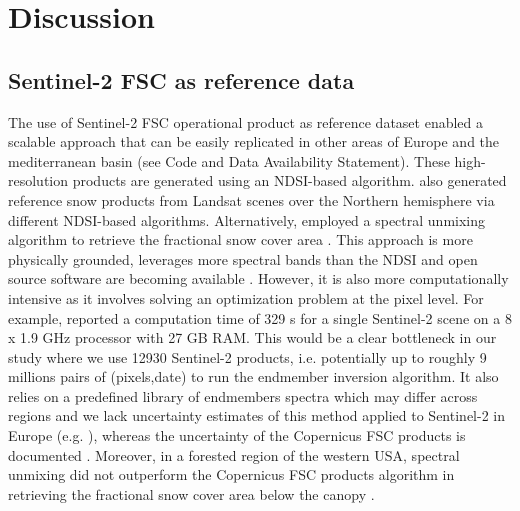 \documentclass[tc, manuscript]{copernicus}
\begin{document}
\section{Discussion}
\label{sec: discussion}
 
\subsection{Sentinel-2 FSC as reference data}
\label{subsec: disc_sentinel2}

The use of Sentinel-2 FSC operational product as reference dataset enabled a scalable approach that can be easily replicated in other areas of Europe and the mediterranean basin (see Code and Data Availability Statement). These high-resolution products are generated using an NDSI-based algorithm. \cite{schwaizer2020SnowCoverExtentb} also generated reference snow products from Landsat scenes over the Northern hemisphere via different NDSI-based algorithms. Alternatively, \cite{rittger_evaluation_2021} employed a spectral unmixing algorithm to retrieve the fractional snow cover area \citep{painter_retrieval_2009}. This approach is more physically grounded, leverages more spectral bands than the NDSI and open source software are becoming available \citep{stillinger_landsat_2023, rittger_evaluation_2021, bair_snow_2021}. However, it is also more computationally intensive as it involves solving an optimization problem at the pixel level. For example, \cite{keuris_adaptive_2023} reported a computation time of 329 s for a single Sentinel-2 scene on a 8 x 1.9 GHz processor with 27 GB RAM. This would be a clear bottleneck in our study where we use 12930 Sentinel-2 products, i.e. potentially up to roughly 9 millions pairs of (pixels,date) to run the endmember inversion algorithm. It also relies on a predefined library of endmembers spectra which may differ across regions and we lack uncertainty estimates of this method applied to Sentinel-2 in Europe (e.g. \cite{stillinger_landsat_2023, rittger_evaluation_2021, bair_snow_2021}), whereas the uncertainty of the Copernicus FSC products is documented \citep{barrou_dumont_brief_2021}. Moreover, in a forested region of the western USA, spectral unmixing did not outperform the Copernicus FSC products algorithm in retrieving the fractional snow cover area below the canopy \citep{muhuri_performance_2021}. 
\end{document}
